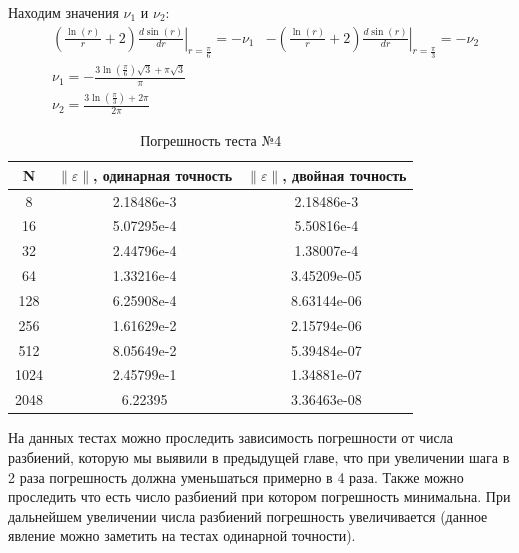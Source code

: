   Находим значения $ \nu_1 $ и $ \nu_2 $:
  \begin{align*}
		& (\frac{\ln(r)}{r} +2) \left. \frac{d\sin(r)}{dr}\right\vert_{r = \frac{\pi}{6}} = -\nu _1
		&-(\frac{\ln(r)}{r} +2) \left. \frac{d\sin(r)}{dr}\right\vert_{r = \frac{\pi}{3}} = -\nu_2 \\
    & \nu_1 = -\frac{3 \ln(\frac{\pi}{6}) \sqrt{3} + \pi \sqrt{3}}{\pi} \\
    &\nu_2 = \frac{3\ln(\frac{\pi}{3}) + 2\pi}{2 \pi}
  \end{align*}
  \begin{table}[H]
    \centering
    \begin{tabular}{c | c | c}
      \toprule
      N & $ \left\lVert \varepsilon \right\rVert  $, одинарная точность & $ \left\lVert \varepsilon \right\rVert  $, двойная точность \\
      \midrule
      8 & 2.18486e-3 & 2.18486e-3\\
      16 & 5.07295e-4 & 5.50816e-4\\
      32 & 2.44796e-4 & 1.38007e-4\\
      64 & 1.33216e-4 & 3.45209e-05\\
      128 & 6.25908e-4 & 8.63144e-06\\
      256 & 1.61629e-2 & 2.15794e-06\\
      512 & 8.05649e-2 & 5.39484e-07\\
      1024 & 2.45799e-1 & 1.34881e-07\\
      2048 & 6.22395 & 3.36463e-08\\
      \bottomrule
    \end{tabular}
    \caption{Погрешность теста №4}
  \end{table}

На данных тестах можно проследить зависимость погрешности от числа разбиений, которую мы выявили в предыдущей главе, что при увеличении шага
в 2 раза погрешность должна уменьшаться примерно в 4 раза. Также можно проследить что есть число разбиений при котором погрешность минимальна.
При дальнейшем увеличении числа разбиений погрешность увеличивается (данное явление можно заметить на тестах одинарной точности).